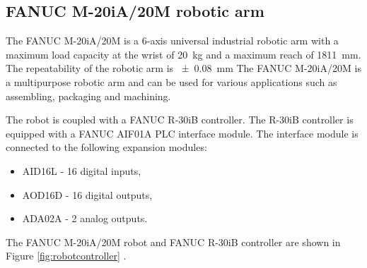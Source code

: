 \subsection{FANUC M-20iA/20M robotic arm}

The FANUC M-20iA/20M is a 6-axis universal industrial robotic arm with a maximum load capacity at the wrist of \SI{20}{\kg} and a maximum reach of \SI{1811}{\mm}. The repeatability of the robotic arm is \SI{+-0.08}{\mm} The FANUC M-20iA/20M is a multipurpose robotic arm and can be used for various applications such as assembling, packaging and machining.

The robot is coupled with a FANUC R-30iB controller. The R-30iB controller is equipped with a FANUC AIF01A PLC interface module. The interface module is connected to the following expansion modules:

\begin{itemize}
    \item AID16L - 16 digital inputs,
    \item AOD16D - 16 digital outputs,
    \item ADA02A - 2 analog outputs. \cite{fanucunitmanual}
\end{itemize}

The  FANUC M-20iA/20M robot and FANUC R-30iB controller are shown in Figure \ref{fig:robotcontroller} \cite{fanucrobot}.


